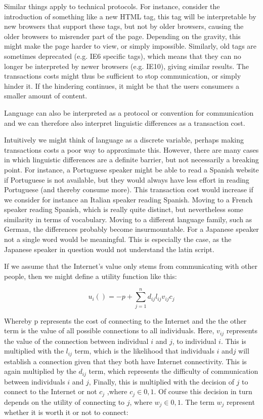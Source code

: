 \documentclass[a4paper,british]{article}\usepackage[]{graphicx}\usepackage[]{color}
\begin{document}
Similar things apply to technical protocols. For instance, consider
the introduction of something like a new HTML tag, this tag will be
interpretable by new browsers that support these tags, but not by
older browsers, causing the older browsers to misrender part of the
page. Depending on the gravity, this might make the page harder to
view, or simply impossible. Similarly, old tags are sometimes deprecated
(e.g. IE6 specific tags), which means that they can no longer be interpreted
by newer browsers (e.g. IE10), giving similar results. The transactions
costs might thus be sufficient to stop communication, or simply hinder
it. If the hindering continues, it might be that the users consumers
a smaller amount of content.

Language can also be interpreted as a protocol or convention for communication
and we can therefore also interpret linguistic differences as a transaction
cost.

Intuitively we might think of language as a discrete variable, perhaps
making transactions costs a poor way to approximate this. However,
there are many cases in which linguistic differences are a definite
barrier, but not necessarily a breaking point. For instance, a Portuguese
speaker might be able to read a Spanish website if Portuguese is not
available, but they would always have less effort in reading Portuguese
(and thereby consume more). This transaction cost would increase if
we consider for instance an Italian speaker reading Spanish. Moving
to a French speaker reading Spanish, which is really quite distinct,
but nevertheless some similarity in terms of vocabulary. Moving to
a different language family, such as German, the differences probably
become insurmountable. For a Japanese speaker not a single word would
be meaningful. This is especially the case, as the Japanese speaker
in question would not understand the latin script. 

If we assume that the Internet's value only stems from communicating
with other people, then we might define a utility function like this: 

\begin{equation}
u_{i}()=-p+\sum_{j=1}^{n}d_{ij}l_{ij}v_{ij}c_{j}
\end{equation}

Whereby p represents the cost of connecting to the Internet and the
the other term is the value of all possible connections to all individuals.
Here, $v_{ij}$ represents the value of the connection between individual
$i$ and $j$, to individual $i$. This is multiplied with the $l_{ij}$
term, which is the likelihood that individuals $i$ and$j$ will establish
a connection given that they both have Internet connectivity. This
is again multiplied by the $d_{ij}$ term, which represents the difficulty
of communication between individuals $i$ and $j$, Finally, this
is multiplied with the decision of $j$ to connect to the Internet
or not $c_{j}$ ,where $c_{j}\in{0,1}$. Of course this decision in
turn depends on the utility of connecting to $j$, where $w_{j}\in{0,1}$.
The term $w_{j}$ represent whether it is worth it or not to connect:
\end{document}
